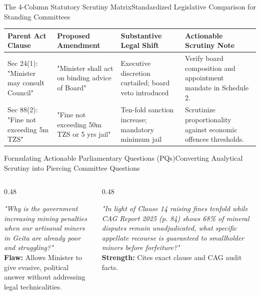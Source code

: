 \documentclass[aspectratio=169, 10pt]{beamer}
\begin{document}
\begin{frame}{The 4-Column Statutory Scrutiny Matrix}{Standardized Legislative Comparison for Standing Committees}
  \begin{center}
    \small
    \begin{tabularx}{0.94\textwidth}{@{}>{}p{2.6cm}>{}p{3.4cm}>{}p{3.8cm}X@{}}
      \toprule
      \textbf{\textcolor{tanzaniablue}{Parent Act Clause}} & \textbf{\textcolor{tanzaniablue}{Proposed Amendment}} & \textbf{\textcolor{tanzaniablue}{Substantive Legal Shift}} & \textbf{\textcolor{tanzaniablue}{Actionable Scrutiny Note}} \\
      \midrule
      Sec 24(1): "Minister may consult Council" & "Minister shall act on binding advice of Board" & Executive discretion curtailed; board veto introduced & Verify board composition and appointment mandate in Schedule 2. \\
      \addlinespace
      Sec 88(2): "Fine not exceeding 5m TZS" & "Fine not exceeding 50m TZS or 5 yrs jail" & Ten-fold sanction increase; mandatory minimum jail & Scrutinize proportionality against economic offences thresholds. \\
      \bottomrule
    \end{tabularx}
  \end{center}
\end{frame}

\begin{frame}{Formulating Actionable Parliamentary Questions (PQs)}{Converting Analytical Scrutiny into Piercing Committee Questions}
  \begin{columns}[c]
    \begin{column}{0.48\textwidth}
      \begin{tcolorbox}[colback=lightgrey, colframe=tanzaniablue, arc=1.5mm, boxrule=0.8pt, title=\textbf{Weak PQ (Vague / Opinion)}]
        \small
        \textit{"Why is the government increasing mining penalties when our artisanal miners in Geita are already poor and struggling?"}\\[4pt]
        \textcolor{tanzaniablue}{\textbf{Flaw:}} Allows Minister to give evasive, political answer without addressing legal technicalities.
      \end{tcolorbox}
    \end{column}
    \begin{column}{0.48\textwidth}
      \begin{tcolorbox}[colback=calloutbg, colframe=suagreen, arc=1.5mm, boxrule=0.8pt, title=\textbf{Actionable PQ (Evidence-Grounded)}]
        \small
        \textit{"In light of Clause 14 raising fines tenfold while CAG Report 2025 (p. 84) shows 68\% of mineral disputes remain unadjudicated, what specific appellate recourse is guaranteed to smallholder miners before forfeiture?"}\\[4pt]
        \textcolor{suagreen}{\textbf{Strength:}} Cites exact clause and CAG audit facts.
      \end{tcolorbox}
    \end{column}
  \end{columns}
\end{frame}
\end{document}
